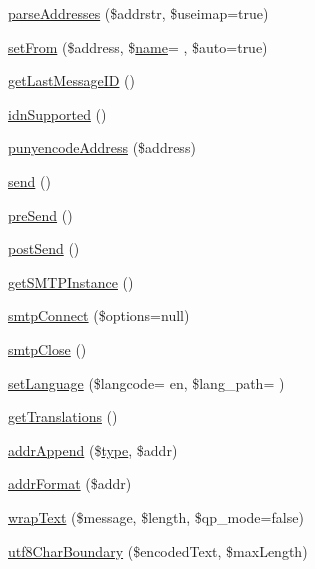 \begin{DoxyCompactItemize}
\hyperlink{class_p_h_p_mailer_a313dd1ceda0f815e243fc4298ce725df}{parse\+Addresses} (\$addrstr, \$useimap=true)
\item 
\hyperlink{class_p_h_p_mailer_a28a927fc06372ccebb2a58213ff83b17}{set\+From} (\$address, \$\hyperlink{user_8php_a765af5e9671743530143a6d3670fd9a6}{name}= \textquotesingle{}\textquotesingle{}, \$auto=true)
\item 
\hyperlink{class_p_h_p_mailer_ad7aa172bae0dacb16fa63b832cb82073}{get\+Last\+Message\+ID} ()
\item 
\hyperlink{class_p_h_p_mailer_aeb34ed263912fba175ccb4dabc06f9c9}{idn\+Supported} ()
\item 
\hyperlink{class_p_h_p_mailer_a53f031a9823e893efcae14422999619b}{punyencode\+Address} (\$address)
\item 
\hyperlink{class_p_h_p_mailer_a12bcef5130168b80d3d52dc82213f19a}{send} ()
\item 
\hyperlink{class_p_h_p_mailer_a528cfdd34d79b053a812a735632593ea}{pre\+Send} ()
\item 
\hyperlink{class_p_h_p_mailer_aa2e32c2514a2f342c87509f9d9af34cb}{post\+Send} ()
\item 
\hyperlink{class_p_h_p_mailer_af7e9144e6dfd367a6a05dc8b794a4481}{get\+S\+M\+T\+P\+Instance} ()
\item 
\hyperlink{class_p_h_p_mailer_a58e7e9d1a3e59fc691476b400a7b8fe0}{smtp\+Connect} (\$options=null)
\item 
\hyperlink{class_p_h_p_mailer_a3ec2fab4c4b1ab20a992704c35be6364}{smtp\+Close} ()
\item 
\hyperlink{class_p_h_p_mailer_a9da63815ca021badd4fbffa1f568976a}{set\+Language} (\$langcode= \textquotesingle{}en\textquotesingle{}, \$lang\+\_\+path= \textquotesingle{}\textquotesingle{})
\item 
\hyperlink{class_p_h_p_mailer_ac9287affc67c9523787013f3a22731cc}{get\+Translations} ()
\item 
\hyperlink{class_p_h_p_mailer_ab43217a9ec1bb4fe5a88d2f409fa7ae2}{addr\+Append} (\$\hyperlink{_ossn_wall_2actions_2wall_2post_2group_8php_a2dc1bb4e1ed0029daa81ac0776b14b51}{type}, \$addr)
\item 
\hyperlink{class_p_h_p_mailer_a9306048710347e893a743acd0f39bb45}{addr\+Format} (\$addr)
\item 
\hyperlink{class_p_h_p_mailer_aabf081d0812225a5cf80c27ffa74c76c}{wrap\+Text} (\$message, \$length, \$qp\+\_\+mode=false)
\item 
\hyperlink{class_p_h_p_mailer_a155c6b34e020054e9c19f0a94bacee38}{utf8\+Char\+Boundary} (\$encoded\+Text, \$max\+Length)

\end{DoxyCompactItemize}

